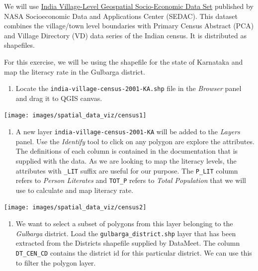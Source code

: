 \documentclass[
  12pt,
  a4paper]{article}
\providecommand{\tightlist}{%
  \setlength{\itemsep}{0pt}\setlength{\parskip}{0pt}}
\begin{document}
We will use
\href{https://sedac.ciesin.columbia.edu/data/set/india-india-village-level-geospatial-socio-econ-1991-2001}{India
Village-Level Geospatial Socio-Economic Data Set} published by NASA
Socioeconomic Data and Applications Center (SEDAC). This dataset
combines the village/town level boundaries with Primary Census Abstract
(PCA) and Village Directory (VD) data series of the Indian census. It is
distributed as shapefiles.

For this exercise, we will be using the shapefile for the state of
Karnataka and map the literacy rate in the Gulbarga district.

\begin{enumerate}
\def\labelenumi{\arabic{enumi}.}
\tightlist
\item
  Locate the \texttt{india-village-census-2001-KA.shp} file in the
  \emph{Browser} panel and drag it to QGIS canvas.
\end{enumerate}

\begin{center}\texttt{[image: images/spatial\_data\_viz/census1]} \end{center}

\begin{enumerate}
\def\labelenumi{\arabic{enumi}.}
\setcounter{enumi}{1}
\tightlist
\item
  A new layer \texttt{india-village-census-2001-KA} will be added to the
  \emph{Layers} panel. Use the \emph{Identify} tool to click on any
  polygon are explore the attributes. The definitions of each column is
  contained in the documentation that is supplied with the data. As we
  are looking to map the literacy levels, the attributes with
  \texttt{\_LIT} suffix are useful for our purpose. The \texttt{P\_LIT}
  column refers to \emph{Person Literates} and \texttt{TOT\_P} refers to
  \emph{Total Population} that we will use to calculate and map literacy
  rate.
\end{enumerate}

\begin{center}\texttt{[image: images/spatial\_data\_viz/census2]} \end{center}

\begin{enumerate}
\def\labelenumi{\arabic{enumi}.}
\setcounter{enumi}{2}
\tightlist
\item
  We want to select a subset of polygons from this layer belonging to
  the \emph{Gulbarga} district. Load the \texttt{gulbarga\_district.shp}
  layer that has been extracted from the Districts shapefile supplied by
  DataMeet. The column \texttt{DT\_CEN\_CD} contains the district id for
  this particular district. We can use this to filter the polygon layer.
\end{enumerate}
\end{document}
